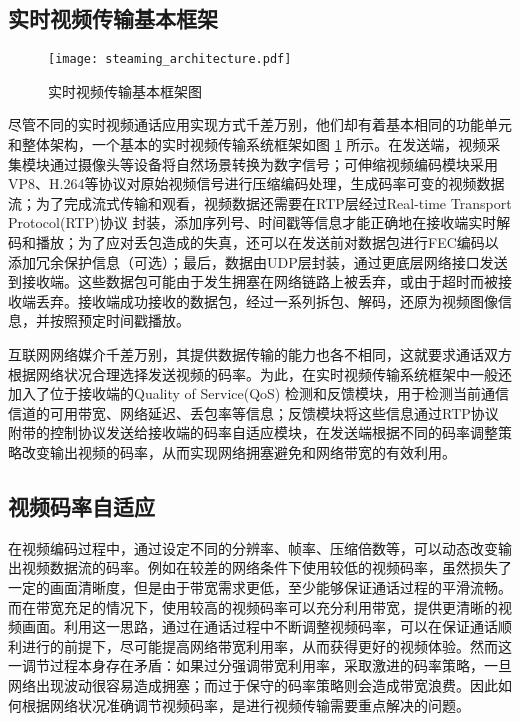 \subsection{实时视频传输基本框架}

\begin{figure}[htbp]
  \centering
  \texttt{[image: steaming\_architecture.pdf]}
  \caption{实时视频传输基本框架图}
  \label{fig:steaming_architecture}
\end{figure}

尽管不同的实时视频通话应用实现方式千差万别，他们却有着基本相同的功能单元和整体架构，一个基本的实时视频传输系统框架如图 \ref{fig:steaming_architecture} \cite{wu2000transporting}所示。在发送端，视频采集模块通过摄像头等设备将自然场景转换为数字信号；可伸缩视频编码模块采用VP8、H.264等协议对原始视频信号进行压缩编码处理，生成码率可变的视频数据流；为了完成流式传输和观看，视频数据还需要在RTP层经过Real-time Transport Protocol(RTP)协议 \cite{jacobson2003rtp} 封装，添加序列号、时间戳等信息才能正确地在接收端实时解码和播放；为了应对丢包造成的失真，还可以在发送前对数据包进行FEC编码以添加冗余保护信息（可选）；最后，数据由UDP层封装，通过更底层网络接口发送到接收端。这些数据包可能由于发生拥塞在网络链路上被丢弃，或由于超时而被接收端丢弃。接收端成功接收的数据包，经过一系列拆包、解码，还原为视频图像信息，并按照预定时间戳播放。

互联网网络媒介千差万别，其提供数据传输的能力也各不相同，这就要求通话双方根据网络状况合理选择发送视频的码率。为此，在实时视频传输系统框架中一般还加入了位于接收端的Quality of Service(QoS) 检测和反馈模块，用于检测当前通信信道的可用带宽、网络延迟、丢包率等信息；反馈模块将这些信息通过RTP协议附带的控制协议发送给接收端的码率自适应模块，在发送端根据不同的码率调整策略改变输出视频的码率，从而实现网络拥塞避免和网络带宽的有效利用。


\subsection{视频码率自适应}
在视频编码过程中，通过设定不同的分辨率、帧率、压缩倍数等，可以动态改变输出视频数据流的码率。例如在较差的网络条件下使用较低的视频码率，虽然损失了一定的画面清晰度，但是由于带宽需求更低，至少能够保证通话过程的平滑流畅。而在带宽充足的情况下，使用较高的视频码率可以充分利用带宽，提供更清晰的视频画面。利用这一思路，通过在通话过程中不断调整视频码率，可以在保证通话顺利进行的前提下，尽可能提高网络带宽利用率，从而获得更好的视频体验。然而这一调节过程本身存在矛盾：如果过分强调带宽利用率，采取激进的码率策略，一旦网络出现波动很容易造成拥塞；而过于保守的码率策略则会造成带宽浪费。因此如何根据网络状况准确调节视频码率，是进行视频传输需要重点解决的问题。

